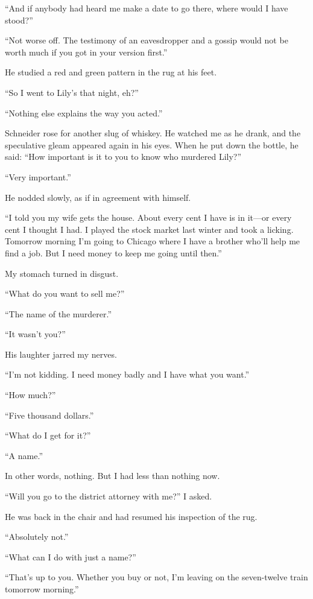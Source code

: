 \documentclass{novel}
\begin{document}
“And if anybody had heard me make a date to go there, where would I have stood?”

“Not worse off. The testimony of an eavesdropper and a gossip would not be worth much if you got in your version first.”

He studied a red and green pattern in the rug at his feet.

“So I went to Lily’s that night, eh?”

“Nothing else explains the way you acted.”

Schneider rose for another slug of whiskey. He watched me as he drank, and the speculative gleam appeared again in his eyes. When he put down the bottle, he said: “How important is it to you to know who murdered Lily?”

“Very important.”

He nodded slowly, as if in agreement with himself.

“I told you my wife gets the house. About every cent I have is in it—or every cent I thought I had. I played the stock market last winter and took a licking. Tomorrow morning I’m going to Chicago where I have a brother who’ll help me find a job. But I need money to keep me going until then.”

My stomach turned in disgust.

“What do you want to sell me?”

“The name of the murderer.”

“It wasn’t you?”

His laughter jarred my nerves.

“I’m not kidding. I need money badly and I have what you want.”

“How much?”

“Five thousand dollars.”

“What do I get for it?”

“A name.”

In other words, nothing. But I had less than nothing now.

“Will you go to the district attorney with me?” I asked.

He was back in the chair and had resumed his inspection of the rug. 

“Absolutely not.”

“What can I do with just a name?”

“That’s up to you. Whether you buy or not, I’m leaving on the seven-twelve train tomorrow morning.”

\scenestars
\end{document}
